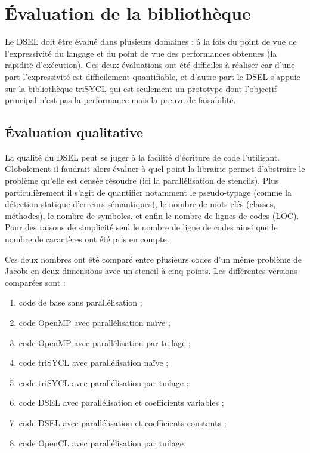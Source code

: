 
\chapter{\'Evaluation de la bibliothèque}

Le DSEL doit être évalué dans plusieurs domaines : à la fois du point de vue de l'expressivité du langage et du point de vue des performances obtenues (la rapidité d'exécution). Ces deux évaluations ont été difficiles à réaliser car d'une part l'expressivité est difficilement quantifiable, et d'autre part le DSEL s'appuie sur la bibliothèque \textsf{triSYCL} qui est seulement un prototype dont l'objectif principal n'est pas la performance mais la preuve de faisabilité.


\section{\'Evaluation qualitative}

La qualité du DSEL peut se juger à la facilité d'écriture de code l'utilisant. Globalement il faudrait alors évaluer à quel point la librairie permet d'abstraire le problème qu'elle est censée résoudre (ici la parallélisation de stencils). Plus particulièrement il s'agit de quantifier notamment le pseudo-typage (comme la détection statique d'erreurs sémantiques), le nombre de mots-clés (classes, méthodes), le nombre de symboles, et enfin le nombre de lignes de codes (LOC). Pour des raisons de simplicité seul le nombre de ligne de codes ainsi que le nombre de caractères ont été pris en compte. 

Ces deux nombres ont été comparé entre plusieurs codes d'un même problème de Jacobi en deux dimensions avec un stencil à cinq points. Les différentes versions comparées sont :
\begin{enumerate}
\item code de base sans parallélisation ;
\item code \textsf{OpenMP} avec parallélisation naïve ;
\item code \textsf{OpenMP} avec parallélisation par tuilage ;
\item code \textsf{triSYCL} avec parallélisation naïve ;
\item code \textsf{triSYCL} avec parallélisation par tuilage ;
\item code \textsf{DSEL} avec parallélisation et coefficients variables ;
\item code \textsf{DSEL} avec parallélisation et coefficients constants ;
\item code \textsf{OpenCL} avec parallélisation par tuilage.
\end{enumerate}

